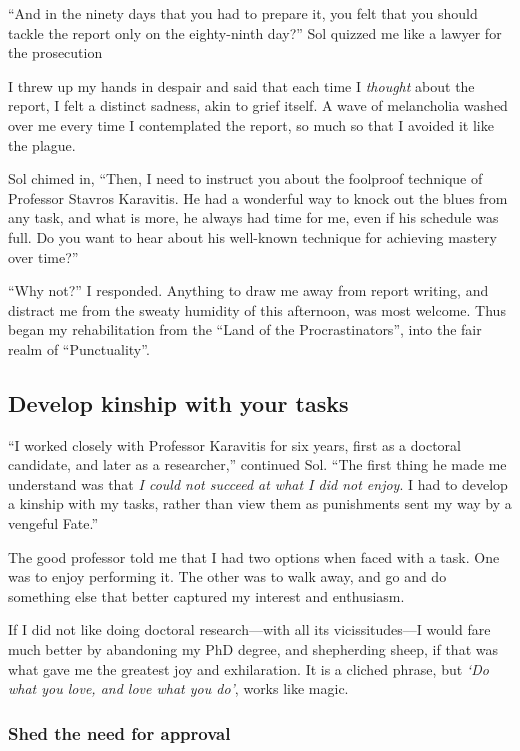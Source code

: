 \documentclass[
  a4paper,
]{article}
\begin{document}
``And in the ninety days that you had to prepare it, you felt that you
should tackle the report only on the eighty-ninth day?'' Sol quizzed me
like a lawyer for the prosecution

I threw up my hands in despair and said that each time I \emph{thought}
about the report, I felt a distinct sadness, akin to grief itself. A
wave of melancholia washed over me every time I contemplated the report,
so much so that I avoided it like the plague.

Sol chimed in, ``Then, I need to instruct you about the foolproof
technique of Professor Stavros Karavitis. He had a wonderful way to
knock out the blues from any task, and what is more, he always had time
for me, even if his schedule was full. Do you want to hear about his
well-known technique for achieving mastery over time?''

``Why not?'' I responded. Anything to draw me away from report writing,
and distract me from the sweaty humidity of this afternoon, was most
welcome. Thus began my rehabilitation from the ``Land of the
Procrastinators'', into the fair realm of ``Punctuality''.

\hypertarget{develop-kinship-with-your-tasks}{%
\subsection{Develop kinship with your
tasks}\label{develop-kinship-with-your-tasks}}

``I worked closely with Professor Karavitis for six years, first as a
doctoral candidate, and later as a researcher,'' continued Sol. ``The
first thing he made me understand was that \emph{I could not succeed at
what I did not enjoy}. I had to develop a kinship with my tasks, rather
than view them as punishments sent my way by a vengeful Fate.''

The good professor told me that I had two options when faced with a
task. One was to enjoy performing it. The other was to walk away, and go
and do something else that better captured my interest and enthusiasm.

If I did not like doing doctoral research---with all its
vicissitudes---I would fare much better by abandoning my PhD degree, and
shepherding sheep, if that was what gave me the greatest joy and
exhilaration. It is a cliched phrase, but \emph{`Do what you love, and
love what you do'}, works like magic.

\hypertarget{shed-the-need-for-approval}{%
\subsubsection{Shed the need for
approval}\label{shed-the-need-for-approval}}
\end{document}
